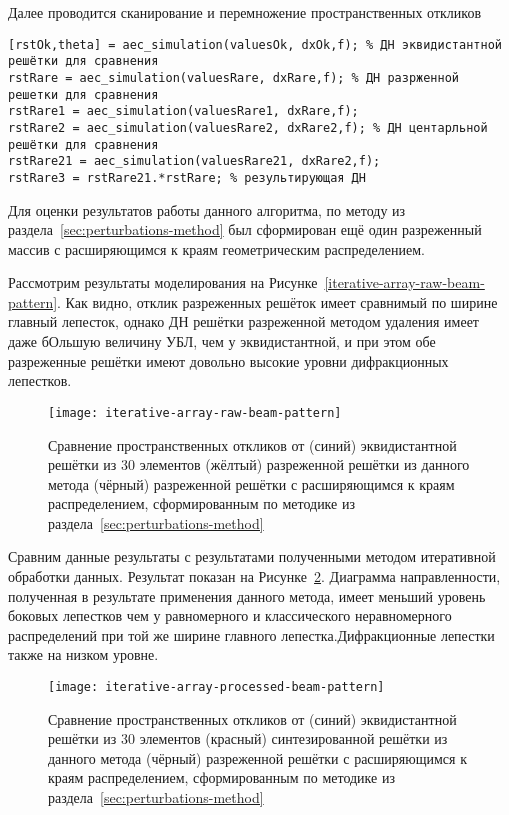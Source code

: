 Далее проводится сканирование и перемножение пространственных откликов

\begin{verbatim}
[rstOk,theta] = aec_simulation(valuesOk, dxOk,f); % ДН эквидистантной решётки для сравнения
rstRare = aec_simulation(valuesRare, dxRare,f); % ДН разрженной решетки для сравнения
rstRare1 = aec_simulation(valuesRare1, dxRare,f);
rstRare2 = aec_simulation(valuesRare2, dxRare2,f); % ДН центарльной решётки для сравнения
rstRare21 = aec_simulation(valuesRare21, dxRare2,f);
rstRare3 = rstRare21.*rstRare; % результирующая ДН
\end{verbatim}

Для оценки результатов работы данного алгоритма, по методу из раздела~\ref{sec:perturbations-method} был сформирован 
ещё один разреженный массив с расширяющимся к краям геометрическим распределением.

Рассмотрим результаты моделирования на Рисунке~\ref{iterative-array-raw-beam-pattern}. Как видно, отклик разреженных 
решёток имеет сравнимый по ширине главный лепесток, однако ДН решётки разреженной методом 
удаления имеет даже бОльшую величину УБЛ, чем у эквидистантной, 
и при этом обе разреженные решётки имеют довольно высокие уровни дифракционных лепестков.

\begin{figure}[!ht]
    \centering
    \texttt{[image: iterative-array-raw-beam-pattern]}
    \caption{Сравнение пространственных откликов от 
    (синий) эквидистантной решётки из 30 элементов
    (жёлтый) разреженной решётки из данного метода
    (чёрный) разреженной решётки с расширяющимся к краям распределением, сформированным по методике из раздела~\ref{sec:perturbations-method}
    }%
    \label{fig:iterative-array-raw-beam-pattern}
\end{figure}

Сравним данные результаты с результатами полученными методом итеративной обработки данных. Результат показан на Рисунке~\ref{fig:iterative-array-processed-beam-pattern}. 
Диаграмма направленности, полученная в результате применения данного метода, имеет меньший уровень боковых лепестков чем у равномерного и классического неравномерного распределений при той же ширине главного лепестка.Дифракционные лепестки также на низком уровне. 

\begin{figure}[H]
    \centering
    \texttt{[image: iterative-array-processed-beam-pattern]}
    \caption{Сравнение пространственных откликов от 
    (синий) эквидистантной решётки из 30 элементов
    (красный) синтезированной решётки из данного метода
    (чёрный) разреженной решётки с расширяющимся к краям распределением, сформированным по методике из раздела~\ref{sec:perturbations-method}
    }%
    \label{fig:iterative-array-processed-beam-pattern}
\end{figure}

